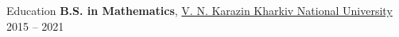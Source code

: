 \begin{cvsection}{Education}
    {\bf B.S. in Mathematics}, \href{https://univer.kharkov.ua/en}{V. N. Karazin Kharkiv National University} \hfill {2015 -- 2021}
\end{cvsection}
